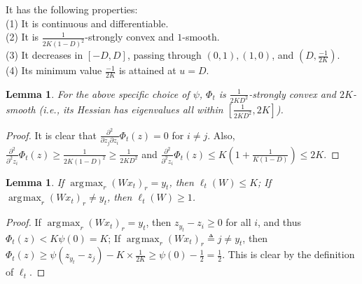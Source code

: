 \documentclass{article}
\newcommand{\e}{\mathbf{e}}
\newtheorem{lemma}[theorem]{Lemma}
\newtheorem{definition}[theorem]{Definition}
\DeclareMathOperator*{\argmax}{\arg\!\max}
\begin{document}
It has the following properties: \\
(1) It is continuous and differentiable. \\
(2) It is $\frac{1}{2K(1-D)^2}$-strongly convex and $1$-smooth. \\
(3) It decreases in $[-D,D]$, passing through $(0,1),(1,0)$, and $(D,\frac{-1}{2K})$. \\
(4) Its minimum value $\frac{-1}{2K}$ is attained at $u=D$. 

\begin{lemma} 
 For the above specific choice of $\psi$, $\Phi_t$ is $\frac{1}{2KD^2}$-strongly convex and $2K$-smooth (i.e., its Hessian has eigenvalues all within $[\frac{1}{2KD^2}, 2K]$). 
 
\end{lemma}
\begin{proof}
It is clear that $\frac{\partial^2}{\partial z_j\partial z_i}\Phi_t(z)=0$ for $i\neq j$. Also, $\frac{\partial^2}{\partial^2 z_i} \Phi_t(z)\geq \frac{1}{2K(1-D)^2}\geq \frac{1}{2KD^2}$ and $\frac{\partial^2}{\partial^2 z_i} \Phi_t(z)\leq K\left(1+\frac{1}{K(1-D)}\right)\leq 2K$. 
\end{proof}

\begin{lemma}
\label{lemma:error_cond}
If $\argmax_r (Wx_t)_r = y_t$, then $\ell_t(W) \leq K$; 
If $\argmax_r (Wx_t)_r \neq y_t$, then $\ell_t(W) \geq 1$.  
\end{lemma}
\begin{proof}
If $\argmax_r (Wx_t)_r = y_t$, then $z_{y_t}-z_i\geq 0$ for all $i$, and thus $\Phi_t(z)< K\psi(0)=K$; 
If $\argmax_r (Wx_t)_r \triangleq j \neq y_t$, then $\Phi_t(z)\geq \psi(z_{y_t}-z_j) - K\times \frac{1}{2K}\geq \psi(0)-\frac{1}{2}=\frac{1}{2}$. 
This is clear by the definition of $\ell_t$. 
\end{proof}
\fi
\end{document}

